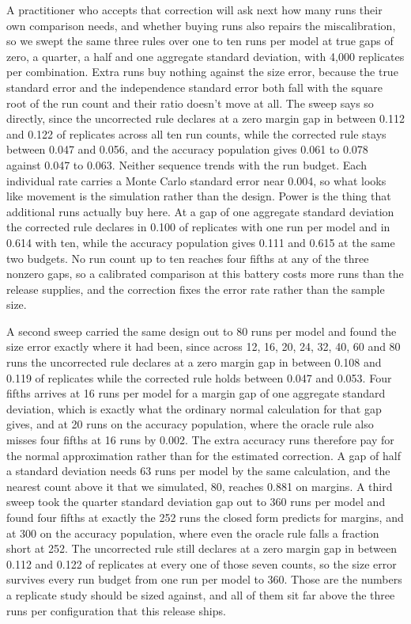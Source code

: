 A practitioner who accepts that correction will ask next how many runs their own comparison needs, and whether buying runs also repairs the miscalibration, so we swept the same three rules over one to ten runs per model at true gaps of zero, a quarter, a half and one aggregate standard deviation, with 4,000 replicates per combination. Extra runs buy nothing against the size error, because the true standard error and the independence standard error both fall with the square root of the run count and their ratio doesn't move at all. The sweep says so directly, since the uncorrected rule declares at a zero margin gap in between 0.112 and 0.122 of replicates across all ten run counts, while the corrected rule stays between 0.047 and 0.056, and the accuracy population gives 0.061 to 0.078 against 0.047 to 0.063. Neither sequence trends with the run budget. Each individual rate carries a Monte Carlo standard error near 0.004, so what looks like movement is the simulation rather than the design. Power is the thing that additional runs actually buy here. At a gap of one aggregate standard deviation the corrected rule declares in 0.100 of replicates with one run per model and in 0.614 with ten, while the accuracy population gives 0.111 and 0.615 at the same two budgets. No run count up to ten reaches four fifths at any of the three nonzero gaps, so a calibrated comparison at this battery costs more runs than the release supplies, and the correction fixes the error rate rather than the sample size.

A second sweep carried the same design out to 80 runs per model and found the size error exactly where it had been, since across 12, 16, 20, 24, 32, 40, 60 and 80 runs the uncorrected rule declares at a zero margin gap in between 0.108 and 0.119 of replicates while the corrected rule holds between 0.047 and 0.053. Four fifths arrives at 16 runs per model for a margin gap of one aggregate standard deviation, which is exactly what the ordinary normal calculation for that gap gives, and at 20 runs on the accuracy population, where the oracle rule also misses four fifths at 16 runs by 0.002. The extra accuracy runs therefore pay for the normal approximation rather than for the estimated correction. A gap of half a standard deviation needs 63 runs per model by the same calculation, and the nearest count above it that we simulated, 80, reaches 0.881 on margins. A third sweep took the quarter standard deviation gap out to 360 runs per model and found four fifths at exactly the 252 runs the closed form predicts for margins, and at 300 on the accuracy population, where even the oracle rule falls a fraction short at 252. The uncorrected rule still declares at a zero margin gap in between 0.112 and 0.122 of replicates at every one of those seven counts, so the size error survives every run budget from one run per model to 360. Those are the numbers a replicate study should be sized against, and all of them sit far above the three runs per configuration that this release ships.

